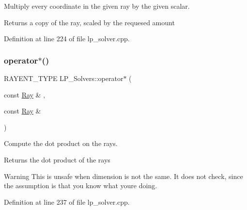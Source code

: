 Multiply every coordinate in the given ray by the given scalar. 

\begin{DoxyReturn}{Returns}
a copy of the ray, scaled by the requesed amount 
\end{DoxyReturn}


Definition at line 224 of file lp\+\_\+solver.\+cpp.

\mbox{\label{group___c_l_s_solvers_gaae1f5d07b6d0f4c12b4c7835977b64eb}} 
\subsubsection{\texorpdfstring{operator$\ast$()}{operator*()}\hspace{0.1cm}{\footnotesize\ttfamily [2/6]}}
{\footnotesize\ttfamily R\+A\+Y\+E\+N\+T\+\_\+\+T\+Y\+PE L\+P\+\_\+\+Solvers\+::operator$\ast$ (\begin{DoxyParamCaption}\item[{const \hyperlink{group___c_l_s_solvers_class_l_p___solvers_1_1_ray}{Ray} \&}]{,  }\item[{const \hyperlink{group___c_l_s_solvers_class_l_p___solvers_1_1_ray}{Ray} \&}]{ }\end{DoxyParamCaption})}



Compute the dot product on the rays. 

\begin{DoxyReturn}{Returns}
the dot product of the rays 
\end{DoxyReturn}
\begin{DoxyWarning}{Warning}
This is unsafe when dimension is not the same. It does not check, since the assumption is that you know what you\textquotesingle{}re doing. 
\end{DoxyWarning}


Definition at line 237 of file lp\+\_\+solver.\+cpp.

\mbox{\label{group___c_l_s_solvers_ga9b4f6991b325c2a42e1f14fc09346277}} 
